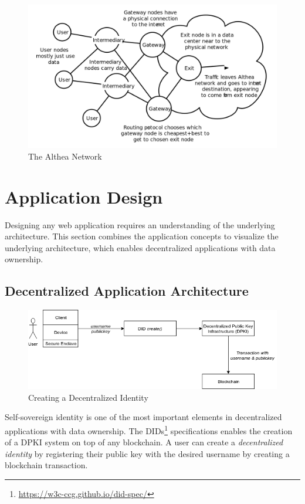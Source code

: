 		\begin{figure}[h]
			\includegraphics[width=\linewidth]{figures/althea-network}
			\caption{\label{fig:althea-network} The Althea Network\protect\footnotemark}
		\end{figure}

\cleardoublepage
\section{Application Design}
	Designing any web application requires an understanding of the underlying architecture. This section combines the application concepts to visualize the underlying architecture, which enables decentralized applications with data ownership.
	
	\subsection{Decentralized Application Architecture}
	\begin{figure}[h]
		\includegraphics[width=\linewidth]{figures/did-create}
		\caption{\label{fig:did-create} Creating a Decentralized Identity}
	\end{figure}

	Self-sovereign identity is one of the most important elements in decentralized applications with data ownership.  The DIDs\footnote{\url{https://w3c-ccg.github.io/did-spec/}} specifications enables the creation of a DPKI system on top of any blockchain. A user can create a \textit{decentralized identity} by registering their public key with the desired username by creating a blockchain transaction.
	
